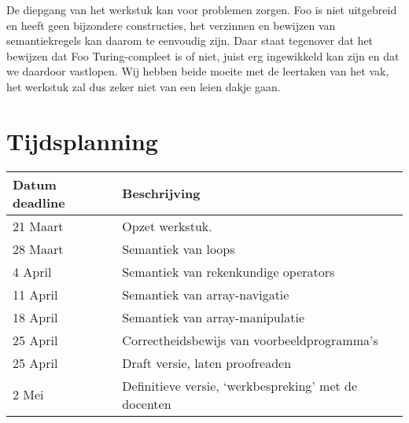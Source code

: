 \documentclass[11pt]{article}
\begin{document}
De diepgang van het werkstuk kan voor problemen zorgen. Foo is niet uitgebreid en heeft geen bijzondere constructies, het verzinnen en bewijzen van semantiekregels kan daarom te eenvoudig zijn. Daar staat tegenover dat het bewijzen dat Foo Turing-compleet is of niet, juist erg ingewikkeld kan zijn en dat we daardoor vastlopen.
\newline
Wij hebben beide moeite met de leertaken van het vak, het werkstuk zal dus zeker niet van een leien dakje gaan.

\section{Tijdsplanning}

\begin{center}
    \begin{tabular}{ | l | p{15cm} |}
    \hline
    Datum deadline & Beschrijving \\ \hline
    21 Maart & Opzet werkstuk. \\ \hline
    28 Maart & Semantiek van loops \\ \hline
    4 April  & Semantiek van rekenkundige operators \\ \hline
    11 April & Semantiek van array-navigatie \\ \hline
    18 April & Semantiek van array-manipulatie \\ \hline
    25 April & Correctheidsbewijs van voorbeeldprogramma's \\ \hline
    25 April & Draft versie, laten proofreaden \\ \hline
    2 Mei    & Definitieve versie, `werkbespreking' met de docenten \\ \hline
    \hline
    \end{tabular}
\end{center}


%
\end{document}
